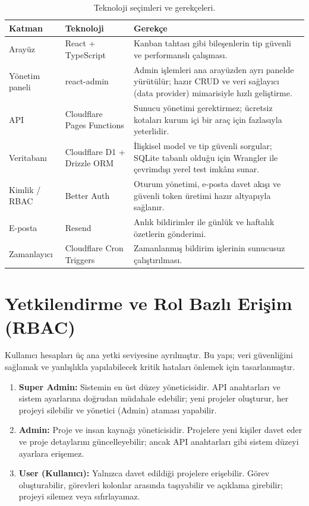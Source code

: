 \documentclass[11pt,a4paper]{article}
\begin{document}
\begin{table}[H]
\centering
\small
\begin{tabularx}{\textwidth}{p{2.6cm}p{4.6cm}X}
\toprule
\textbf{Katman} & \textbf{Teknoloji} & \textbf{Gerekçe}\\
\midrule
Arayüz        & React + TypeScript            & Kanban tahtası gibi bileşenlerin tip güvenli ve performanslı çalışması.\\
\addlinespace
Yönetim paneli& react-admin                   & Admin işlemleri ana arayüzden ayrı panelde yürütülür; hazır CRUD ve veri sağlayıcı (data provider) mimarisiyle hızlı geliştirme.\\
API           & Cloudflare Pages Functions    & Sunucu yönetimi gerektirmez; ücretsiz kotaları kurum içi bir araç için fazlasıyla yeterlidir.\\
Veritabanı    & Cloudflare D1 + Drizzle ORM   & İlişkisel model ve tip güvenli sorgular; SQLite tabanlı olduğu için Wrangler ile çevrimdışı yerel test imkânı sunar.\\
Kimlik / RBAC & Better Auth                   & Oturum yönetimi, e-posta davet akışı ve güvenli token üretimi hazır altyapıyla sağlanır.\\
E-posta       & Resend                        & Anlık bildirimler ile günlük ve haftalık özetlerin gönderimi.\\
Zamanlayıcı   & Cloudflare Cron Triggers      & Zamanlanmış bildirim işlerinin sunucusuz çalıştırılması.\\
\bottomrule
\end{tabularx}
\caption{Teknoloji seçimleri ve gerekçeleri.}
\label{tab:techstack}
\end{table}

\section{Yetkilendirme ve Rol Bazlı Erişim (RBAC)}

Kullanıcı hesapları üç ana yetki seviyesine ayrılmıştır. Bu yapı; veri
güvenliğini sağlamak ve yanlışlıkla yapılabilecek kritik hataları
önlemek için tasarlanmıştır.

\begin{enumerate}
  \item \textbf{Super Admin:} Sistemin en üst düzey yöneticisidir. API
  anahtarları ve sistem ayarlarına doğrudan müdahale edebilir; yeni
  projeler oluşturur, her projeyi silebilir ve yönetici (Admin)
  ataması yapabilir.
  \item \textbf{Admin:} Proje ve insan kaynağı yöneticisidir. Projelere
  yeni kişiler davet eder ve proje detaylarını güncelleyebilir; ancak
  API anahtarları gibi sistem düzeyi ayarlara erişemez.
  \item \textbf{User (Kullanıcı):} Yalnızca davet edildiği projelere
  erişebilir. Görev oluşturabilir, görevleri kolonlar arasında
  taşıyabilir ve açıklama girebilir; projeyi silemez veya sıfırlayamaz.
\end{enumerate}
\end{document}
